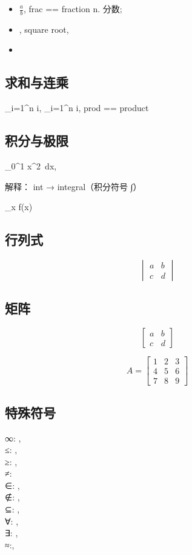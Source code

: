 \documentclass[a4paper,12pt]{article}
\begin{document}
    \begin{itemize}
        \item $\frac{a}{b}$, \; frac == fraction n. 分数;
        \item {}, \; square root,
        \item {}
    \end{itemize}

    \subsection{求和与连乘}

    \sum_{i=1}^n i, \quad \prod_{i=1}^n i, \;  prod == product

    \subsection{积分与极限}

    \int_0^1 x^2\, dx, \quad

    解释： int → integral（积分符号 ∫）

    \lim_{x \to \infty} f(x)

    \subsection{行列式}

    \[
    \begin{vmatrix}
        a & b \\ c & d
    \end{vmatrix}
    \]

    \subsection{矩阵}

    $$
    \begin{bmatrix}
        a & b \\ c & d
    \end{bmatrix}
    $$

    \[
        A = \begin{bmatrix}
                1 & 2 & 3 \\
                4 & 5 & 6 \\
                7 & 8 & 9
        \end{bmatrix}
    \]

    \subsection{特殊符号}
    ∞: \infty, \\
    ≤: \leq, \\
    ≥: \geq, \\
    ≠: \neq \\
    ∈: \in, \\
    ∉: \notin, \\
    ⊆: \subseteq, \\
    ∀: \forall, \\
    ∃: \exists, \\
    ≈:\approx,
\end{document}

